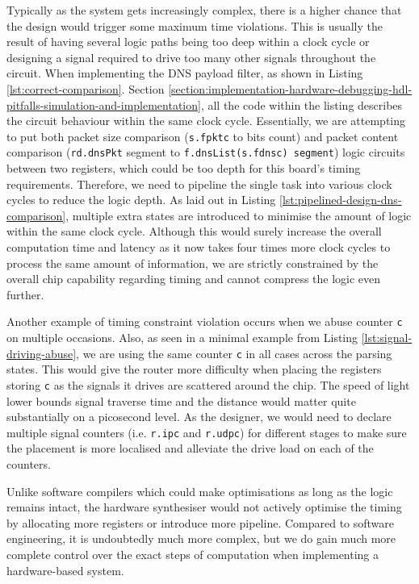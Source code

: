 \documentclass[a4paper]{report}
\newcommand{\code}{\texttt}
\begin{document}
Typically as the system gets increasingly complex, there is a higher chance that the design would trigger some maximum time violations. This is usually the result of having several logic paths being too deep within a clock cycle or designing a signal required to drive too many other signals throughout the circuit. When implementing the DNS payload filter, as shown in Listing \ref{lst:correct-comparison}. Section \ref{section:implementation-hardware-debugging-hdl-pitfalls-simulation-and-implementation}, all the code within the listing describes the circuit behaviour within the same clock cycle. Essentially, we are attempting to put both packet size comparison (\code{s.fpktc} to bits count) and packet content comparison (\code{rd.dnsPkt} segment to \code{f.dnsList(s.fdnsc) segment}) logic circuits between two registers, which could be too depth for this board's timing requirements. Therefore, we need to pipeline the single task into various clock cycles to reduce the logic depth. As laid out in Listing \ref{lst:pipelined-design-dns-comparison}, multiple extra states are introduced to minimise the amount of logic within the same clock cycle. Although this would surely increase the overall computation time and latency as it now takes four times more clock cycles to process the same amount of information, we are strictly constrained by the overall chip capability regarding timing and cannot compress the logic even further.

Another example of timing constraint violation occurs when we abuse counter \code{c} on multiple occasions. Also, as seen in a minimal example from Listing \ref{lst:signal-driving-abuse}, we are using the same counter \code{c} in all cases across the parsing states. This would give the router more difficulty when placing the registers storing \code{c} as the signals it drives are scattered around the chip. The speed of light lower bounds signal traverse time and the distance would matter quite substantially on a picosecond level. As the designer, we would need to declare multiple signal counters (i.e. \code{r.ipc} and \code{r.udpc}) for different stages to make sure the placement is more localised and alleviate the drive load on each of the counters. 

Unlike software compilers which could make optimisations as long as the logic remains intact, the hardware synthesiser would not actively optimise the timing by allocating more registers or introduce more pipeline. Compared to software engineering, it is undoubtedly much more complex, but we do gain much more complete control over the exact steps of computation when implementing a hardware-based system.
\end{document}
